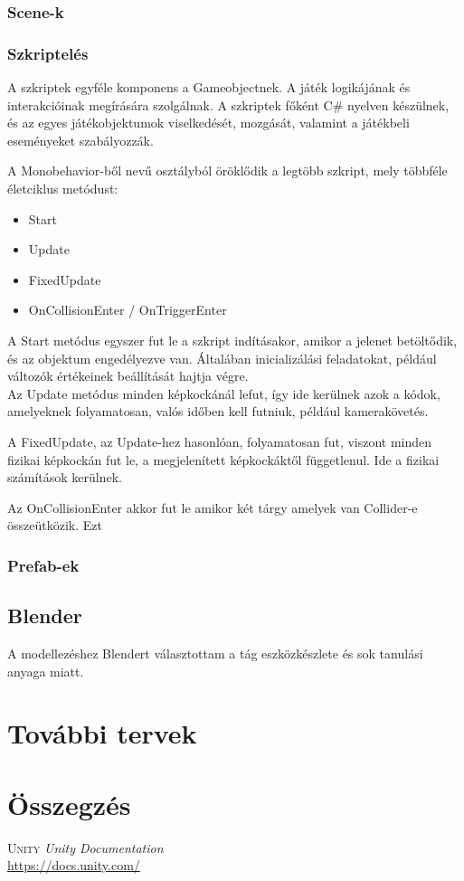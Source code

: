 \documentclass[
]{thesis-ekf}
\theoremstyle{definition}
\theoremstyle{remark}
\begin{document}
\subsection{Scene-k}


\subsection{Szkriptelés}

A szkriptek egyféle komponens a Gameobjectnek. A játék logikájának és interakcióinak megírására szolgálnak. A szkriptek főként C\# nyelven készülnek, és az egyes játékobjektumok viselkedését, mozgását, valamint a játékbeli eseményeket szabályozzák.


A Monobehavior-ből nevű osztályból öröklődik a legtöbb szkript, mely többféle életciklus metódust:

\begin{itemize}
    \item Start
    \item Update
    \item FixedUpdate
    \item OnCollisionEnter / OnTriggerEnter
\end{itemize}

A Start metódus egyszer fut le a szkript indításakor, amikor a jelenet betöltődik, és az objektum engedélyezve van. Általában inicializálási feladatokat, például változók értékeinek beállítását hajtja végre.
\\ 
Az Update metódus minden képkockánál lefut, így ide kerülnek azok a kódok, amelyeknek folyamatosan, valós időben kell futniuk, például kamerakövetés.

A FixedUpdate, az Update-hez hasonlóan, folyamatosan fut, viszont minden fizikai képkockán fut le, a megjelenített képkockáktől függetlenul. Ide a fizikai számítások kerülnek.

Az OnCollisionEnter akkor fut le amikor két tárgy amelyek van Collider-e összeütközik. Ezt 

\subsection{Prefab-ek}



\section{Blender}

A modellezéshez Blendert választottam a tág eszközkészlete és sok tanulási anyaga miatt.


\chapter{További tervek}

\chapter*{Összegzés}


\begin{thebibliography}{55}
    \textsc{Unity} \emph{Unity Documentation}
    \\
    \url{https://docs.unity.com/}



\end{thebibliography}
\end{document}
